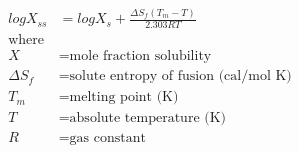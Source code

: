 \documentclass[fleqn, oneside, 11pt]{article}%
\begin{document}
\begin{preview}
\begin{align*}%
logX_{ss} & = logX_{s} + \frac{\Delta S_{f} (T_{m}-T)}{2.303RT} \nonumber \\ 
\text{where} \nonumber \\
X & =  \text{mole fraction solubility} \nonumber \\
\Delta S_{f} & =  \text{solute entropy of fusion (cal/mol K)} \nonumber \\
T_{m} & =  \text{melting point (K)} \nonumber \\
T & =  \text{absolute temperature (K)} \nonumber \\
R & =  \text{gas constant} \nonumber \\
\end{align*} 
\end{preview}
\end{document}
